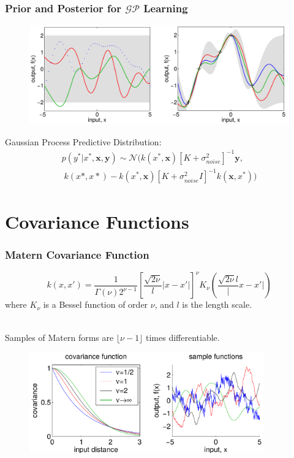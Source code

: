 \documentclass[10pt]{beamer}
\newcommand{\bx}{\mathbf{x}}
\newcommand{\by}{\mathbf{y}}
\newcommand{\gp}{\mathcal{GP}}
\newcommand{\gaussN}{\mathcal{N}}
\begin{document}
  \begin{frame}
    \frametitle{Prior and Posterior for $\gp$ Learning}

    \begin{figure}
      \centering
      \includegraphics[width=\textwidth]{gpRegression.png}
    \end{figure}

    Gaussian Process Predictive Distribution:
      \begin{equation*}
        \begin{array}{c}
          p(y^*|x^*,\bx,\by) \sim \gaussN ( k(x^*,\bx)[K + \sigma^2_{noise}]^{-1}\by, \\[0.2cm]
          \; k(x*,x*) - k(x^*,\bx)[K + \sigma^2_{noise}I]^{-1} k(\bx,x^*) )
        \end{array}
      \end{equation*}
  \end{frame}

  \section{Covariance Functions}

  \begin{frame}
    \frametitle{Matern Covariance Function}

    \begin{equation*}
      k(x,x') = \frac{1}{\Gamma(\nu) 2^{\nu - 1}} \left[ \frac{\sqrt{2 \nu}}{l} |x - x'| \right]^{\nu} K_{\nu} \left( \frac{\sqrt{2 \nu}{l}} |x - x'| \right)
    \end{equation*}
    where $K_{\nu}$ is a Bessel function of order $\nu$, and $l$ is the length scale.\\~

    Samples of Matern forms are $\lfloor \nu - 1 \rfloor$ times differentiable.

    \begin{figure}
      \centering
      \includegraphics[width=0.9\textwidth]{maternCovFunc.png}
    \end{figure}

  \end{frame}
\end{document}
